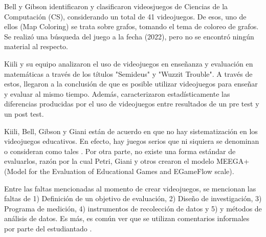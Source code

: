 \documentclass[submission]{eptcs}
\begin{document}
Bell y Gibson \cite{evaluation_of_games_for_teaching_cs} identificaron y clasificaron videosjuegos de Ciencias de la Computación (CS),
considerando un total de 41 videojuegos. De esos, uno de ellos (Map Coloring) se trata sobre grafos, tomando el tema de coloreo de grafos.
Se realizó una búsqueda del juego a la fecha (2022), pero no se encontró ningún material al respecto.


Kiili y su equipo \cite{using_videogames_maths} analizaron el uso de videojuegos en enseñanza
y evaluación en matemáticas a través de los títulos "Semideus" y "Wuzzit Trouble". A través
de estos, llegaron a la conclusión de que es posible utilizar videojuegos para enseñar y
evaluar al mismo tiempo. Además, caracterizaron estadísticamente las diferencias producidas por el uso
de videojuegos entre resultados de un pre test y un post test.

Kiili, Bell, Gibson y Giani \cite{petri2018method} están de acuerdo en que no hay sistematización
en los videojuegos educativos. En efecto, hay juegos serios que ni siquiera se denominan o consideran como tales
\cite{evaluation_of_games_for_teaching_cs}. Por otra parte, no existe una forma estándar de evaluarlos, razón por
la cual Petri, Giani y otros \cite{petri2018method} crearon el modelo MEEGA+ (Model for the Evaluation of Educational
Games and EGameFlow scale).

Entre las faltas mencionadas al momento de crear videojuegos, se mencionan las faltas de 1) Definición de un objetivo
de evaluación, 2) Diseño de investigación, 3) Programa de medición, 4) instrumentos de recolección de datos y 5) y métodos
de análisis de datos. Es más, es común ver que se utilizan comentarios informales por parte del estudiantado \cite{petri2018method}.



\end{document}
